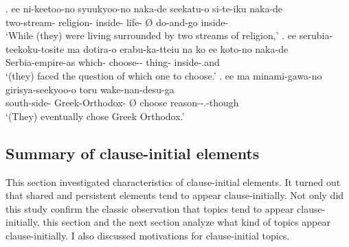  \bg. ee ni-keetoo-no syuukyoo-no naka-de seekatu-o \EM{\O} si-te-iku naka-de \\
 		 two-stream- religion- inside- life- {\O} do-and-go inside- \\
		`While (they) were living surrounded by two streams of religion,'
 \bg. ee serubia-teekoku-tosite ma dotira-o erabu-ka-tteiu na ko ee koto-no naka-de \\
 	 Serbia-empire-as  which- choose--    thing- inside-.and \\
	`(they) faced the question of which one to choose.'
 \bg. ee ma minami-gawa-no girisya-seekyoo-o \EM{\O} toru wake-nan-desu-ga \\
 	  south-side- Greek-Orthodox- {\O} choose reason--.-though \\
	`(They) eventually chose Greek Orthodox.'


\subsection{Summary of clause-initial elements}

This section investigated characteristics of clause-initial elements.
It turned out that
shared and persistent elements tend to appear clause-initially.
Not only did this study confirm the classic observation that
topics tend to appear clause-initially,
this section and the next section analyze what kind of topics appear clause-initially.
I also discussed motivations for clause-initial topics.


